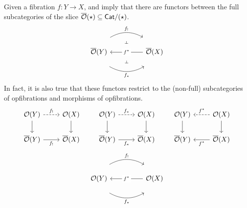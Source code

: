 \begin{remark}\label{rmk:pi-preserve-opfib-mor}
  Given a fibration $f : Y \to X$,
   and
   imply that there are functors
  between the full subcategories of the slice ${\overline{{\mathcal{O}}}}(\star) \subseteq \mathsf{Cat} / (\star)$.
  \[
  \begin{tikzcd}[column sep = huge]
    {\opfib(Y)} & {\opfib(X)}
    \arrow[""{name=0, anchor=center, inner sep=0}, "{f_*}"', shift right=5, bend right, from=1-1, to=1-2]
    \arrow[""{name=1, anchor=center, inner sep=0}, "{f_!}", shift left=5, bend left, from=1-1, to=1-2]
    \arrow[""{name=2, anchor=center, inner sep=0}, "{f^*}"{description}, from=1-2, to=1-1]
    \arrow["\dashv"{anchor=center, rotate=-90}, draw=none, from=1, to=2]
    \arrow["\dashv"{anchor=center, rotate=-90}, draw=none, from=2, to=0]
  \end{tikzcd}
  \]
  In fact, it is also true that these functors restrict to the
  (non-full) subcategories of opfibrations and morphisms of opfibrations.
  \[
  \begin{tikzcd}
    {\opfibcart(Y)} & {\opfibcart(X)} \\
    {\opfib(Y)} & {\opfib(X)}
    \arrow["{f_!}", dashed, from=1-1, to=1-2]
    \arrow[from=1-1, to=2-1]
    \arrow[from=1-2, to=2-2]
    \arrow["{{f_!}}"', from=2-1, to=2-2]
  \end{tikzcd}
  \quad \quad 
  \begin{tikzcd}
    {\opfibcart(Y)} & {\opfibcart(X)} \\
    {\opfib(Y)} & {\opfib(X)}
    \arrow["{f_*}", dashed, from=1-1, to=1-2]
    \arrow[from=1-1, to=2-1]
    \arrow[from=1-2, to=2-2]
    \arrow["{{f_*}}"', from=2-1, to=2-2]
  \end{tikzcd}
  \quad \quad 
  \begin{tikzcd}
    {\opfibcart(Y)} & {\opfibcart(X)} \\
    {\opfib(Y)} & {\opfib(X)}
    \arrow["{f^*}"', dashed, from=1-2, to=1-1]
    \arrow[from=1-1, to=2-1]
    \arrow[from=1-2, to=2-2]
    \arrow["{{f^*}}", from=2-2, to=2-1]
  \end{tikzcd}
  \] 
  \[
  \begin{tikzcd}[column sep = huge]
    {\opfibcart(Y)} & {\opfibcart(X)}
    \arrow[""{name=0, anchor=center, inner sep=0}, "{f_*}"', shift right=5, bend right, from=1-1, to=1-2]
    \arrow[""{name=1, anchor=center, inner sep=0}, "{f_!}", shift left=5, bend left, from=1-1, to=1-2]
    \arrow[""{name=2, anchor=center, inner sep=0}, "{f^*}"{description}, from=1-2, to=1-1]

\end{tikzcd}\]
\end{remark}
